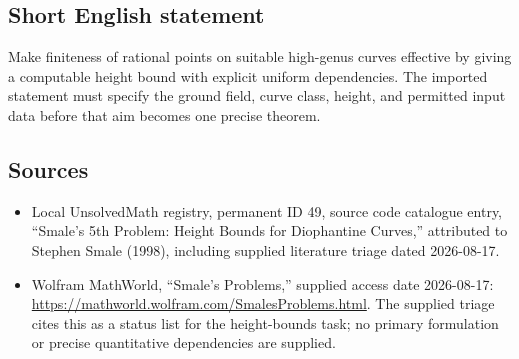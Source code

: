 \documentclass[11pt]{article}
\begin{document}
\subsection{Short English statement}
Make finiteness of rational points on suitable high-genus curves effective by giving a computable height bound with explicit uniform dependencies. The imported statement must specify the ground field, curve class, height, and permitted input data before that aim becomes one precise theorem.
\subsection{Sources}
\begin{itemize}
\item Local UnsolvedMath registry, permanent ID 49, source code catalogue entry, ``Smale's 5th Problem: Height Bounds for Diophantine Curves,'' attributed to Stephen Smale (1998), including supplied literature triage dated 2026-08-17.
\item Wolfram MathWorld, ``Smale's Problems,'' supplied access date 2026-08-17: \url{https://mathworld.wolfram.com/SmalesProblems.html}. The supplied triage cites this as a status list for the height-bounds task; no primary formulation or precise quantitative dependencies are supplied.
\end{itemize}
\end{document}
